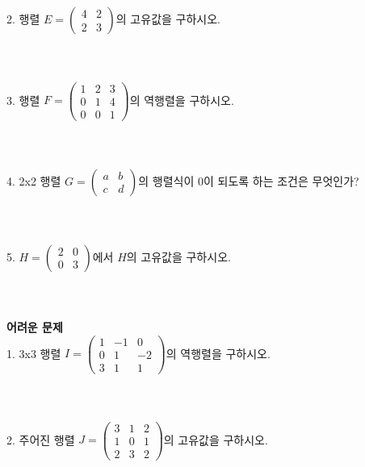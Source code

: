 \documentclass[fleqn]{article}
\begin{document}
2.  행렬 \( E = \begin{pmatrix} 4 & 2 \\ 2 & 3 \end{pmatrix} \)의 고유값을 구하시오. \\ 
\\\\\\

3. 행렬 \( F = \begin{pmatrix} 1 & 2 & 3 \\ 0 & 1 & 4 \\ 0 & 0 & 1 \end{pmatrix} \)의 역행렬을 구하시오. \\ 
\\\\\\

4. 2x2 행렬 \( G = \begin{pmatrix} a & b \\ c & d \end{pmatrix} \)의 행렬식이 0이 되도록 하는 조건은 무엇인가? \\ 
\\\\\\

5. \( H = \begin{pmatrix} 2 & 0 \\ 0 & 3 \end{pmatrix} \)에서 \( H \)의 고유값을 구하시오. \\ 
\\\\\\

\noindent \textbf{어려운 문제} \\

1. 3x3 행렬 \( I = \begin{pmatrix} 1 & -1 & 0 \\ 0 & 1 & -2 \\ 3 & 1 & 1 \end{pmatrix} \)의 역행렬을 구하시오. \\ 
\\\\\\

2. 주어진 행렬 \( J = \begin{pmatrix} 3 & 1 & 2 \\ 1 & 0 & 1 \\ 2 & 3 & 2 \end{pmatrix} \)의 고유값을 구하시오. \\ 
\\\\\\
\end{document}
